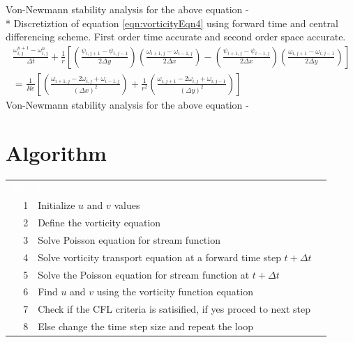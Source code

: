\documentclass{article}
\newcommand{\head}[1]{%
   \textcolor{white}{\textbf{#1}}}
\begin{document}
Von-Newmann stability analysis for the above equation -
\\*
Discretiztion of equation \ref{eqn:vorticityEqn4}  using forward time and central differencing scheme. First order time accurate and second order space accurate. 
\begin{equation} 
\begin{split}
\frac{\omega_{i,j}^{n+1}-\omega_{i,j}^{n}}{\Delta t}+\frac{1}{r}\left[\left(\frac{\psi_{i,j+1}-\psi_{i,j-1}}{2\Delta y}\right)\left(\frac{\omega_{i+1,j}-\omega_{i-1,j}}{2\Delta x}\right) - \left(\frac{\psi_{i+1,j}-\psi_{i-1,j}}{2\Delta x}\right)\left(\frac{\omega_{i,j+1}-\omega_{i,j-1}}{2\Delta y}\right)  \right] \\
  = \frac{1}{Re}\left[\left(\frac{\omega_{i+1,j}-2\omega_{i,j}+\omega_{i-1,j}}{(\Delta x)^2}\right)+\frac{1}{r^2}\left(\frac{\omega_{i,j+1}-2\omega_{i,j}+\omega_{i,j-1}}{(\Delta y)^2}\right) \right]
\end{split}
\end{equation}
Von-Newmann stability analysis for the above equation -

\section{Algorithm}
\begin{table}[ht]
   \centering
   \sffamily
   \begin{tabular}{rlr}
     \rowcolor{black!75}
      \head{No.}& \head{Steps}  \\
     1 & Initialize $u$ and $v$ values        \\
     2 & Define the vorticity equation    \\
     3 & Solve Poisson equation for stream function    \\
     4 & Solve vorticity transport equation at a forward time step $t+\Delta t$ \\
     5 & Solve the Poisson equation for stream function at  $t+\Delta t$   \\
     6 & Find $u$ and $v$ using the vorticity function equation      \\
     7 & Check if the CFL criteria is satisified, if yes proced to next step     \\
     8 & Else change the time step size and repeat the loop     \\
  \end{tabular}
\end{table}
\end{document}
